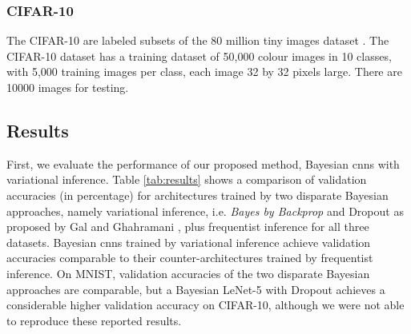 \subsubsection{CIFAR-10}
The CIFAR-10 are labeled subsets of the 80 million tiny images dataset \cite{Torralba:2008:MTI:1444381.1444403}. The CIFAR-10 dataset has a training dataset of 50,000 colour images in 10 classes, with 5,000 training images per class, each image 32 by 32 pixels large. There are 10000 images for testing. 
\newline

\subsection{Results}
First, we evaluate the performance of our proposed method, Bayesian \acp{cnn} with variational inference. Table \ref{tab:results} shows a comparison of validation accuracies (in percentage) for architectures trained by two disparate Bayesian approaches, namely variational inference, i.e. \textit{Bayes by Backprop} and Dropout as proposed by Gal and Ghahramani \cite{gal2015bayesian}, plus frequentist inference for all three datasets. Bayesian \acp{cnn} trained by variational inference achieve validation accuracies comparable to their counter-architectures trained by frequentist inference. On MNIST, validation accuracies of the two disparate Bayesian approaches are comparable, but a Bayesian LeNet-5 with Dropout achieves a considerable higher validation accuracy on CIFAR-10, although we were not able to reproduce these reported results.
\begin{table}[b!]
\tiny
    \centering
    \renewcommand{\arraystretch}{1.5}
    \renewcommand{\arraystretch}{1.5}
    \caption{Comparison of validation accuracies (in percentage) for different architectures with variational inference (VI), frequentist inference and Dropout as a Bayesian approximation as proposed by Gal and Ghahramani \cite{gal2015bayesian} for MNIST, CIFAR-10, and CIFAR-100.}
    \label{tab:results}
\end{table}
